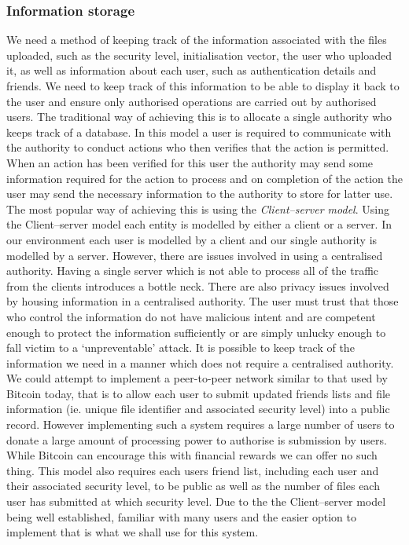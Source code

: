 \documentclass[12pt, titlepage]{article}
\begin{document}
\subsubsection{Information storage}
We need a method of keeping track of the information associated with the files uploaded, such as the security level, initialisation vector, the user who uploaded it, as well as information about each user, such as authentication details and friends. We need to keep track of this information to be able to display it back to the user and ensure only authorised operations are carried out by authorised users.
\newline \indent The traditional way of achieving this is to allocate a single authority who keeps track of a database. In this model a user is required to communicate with the authority to conduct actions who then verifies that the action is permitted. When an action has been verified for this user the authority may send some information required for the action to process and on completion of the action the user may send the necessary information to the authority to store for latter use. The most popular way of achieving this is using the \textit{Client–server model}. Using the Client–server model each entity is modelled by either a client or a server. In our environment each user is modelled by a client and our single authority is modelled by a server. However, there are issues involved in using a centralised authority. Having a single server which is not able to process all of the traffic from the clients introduces a bottle neck. There are also privacy issues involved by housing information in a centralised authority. The user must trust that those who control the information do not have malicious intent and are competent enough to protect the information sufficiently or are simply unlucky enough to fall victim to a `unpreventable' attack.  
\newline \indent It is possible to keep track of the information we need in a manner which does not require a centralised authority. We could attempt to implement a peer-to-peer network similar to that used by Bitcoin today, that is to allow each user to submit updated friends lists and file information (ie. unique file identifier and associated security level) into a public record. However implementing such a system requires a large number of users to donate a large amount of processing power to authorise is submission by users. While Bitcoin can encourage this with financial rewards we can offer no such thing. This model also requires each users friend list, including each user and their associated security level, to be public as well as the number of files each user has submitted at which security level.
\newline \indent Due to the the Client–server model being well established, familiar with many users and the easier option to implement that is what we shall use for this system.
\end{document}
